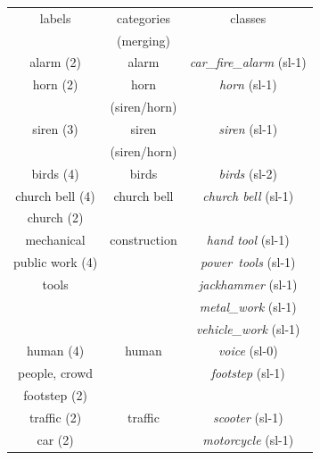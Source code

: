 \documentclass[twoside,twocolumn]{article}
\begin{document}
\setlength\tabcolsep{0.7mm}
\begin{table}[t]
 \centering
{\renewcommand{\arraystretch}{0.9}
\begin{tabular}{ccc}
labels & categories  & classes\\
       & (merging)   &        \\
\hline
alarm (2)             & alarm            &  \textit{car\_fire\_alarm} (sl-1) \\

horn  (2)             & horn             &  \textit{horn} (sl-1)             \\
                      & (siren/horn)     &                                    \\
siren (3)             & siren            &  \textit{siren} (sl-1)            \\
                      & (siren/horn)     &                                    \\
birds (4)             & birds            &  \textit{birds} (sl-2)             \\
\hline
church bell (4)       & church bell      &  \textit{church bell} (sl-1)      \\
church (2)            &                  &                                   \\
\hline
mechanical            & construction     &  \textit{hand tool} (sl-1)       \\
public work  (4)      &                  &  \textit{power\ tools} (sl-1)   \\
tools                 &                  &  \textit{jackhammer} (sl-1)       \\
                      &                  &  \textit{metal\_work} (sl-1)       \\
			          &                  &  \textit{vehicle\_work} (sl-1)     \\  	
\hline			                                                             
human (4)             & human            &   \textit{voice} (sl-0)           \\      
people, crowd         &                  &   \textit{footstep} (sl-1)       \\      
footstep (2)          &                  &                                   \\  
\hline
traffic (2)           & traffic          &  \textit{scooter} (sl-1)         \\
car (2)               &                  &  \textit{motorcycle} (sl-1)       \\

\end{tabular}}
\end{table}
\end{document}
